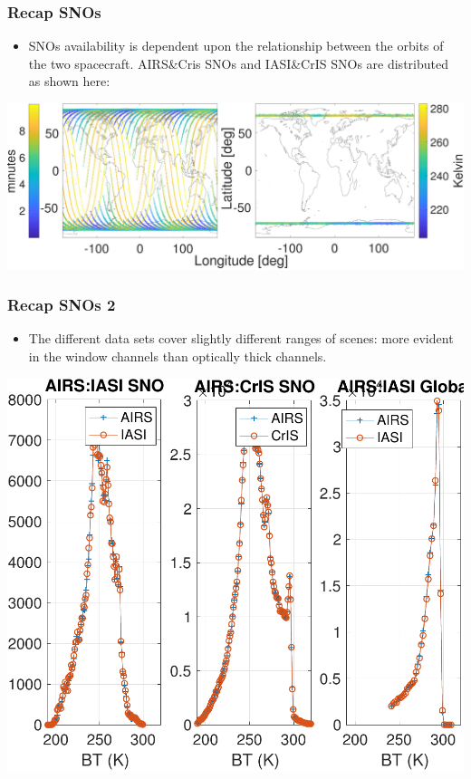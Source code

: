 \documentclass[10pt,t]{beamer}
\begin{document}
\begin{frame}
  \frametitle{Recap SNOs}
  \begin{itemize}
  \item SNOs availability is dependent upon the relationship between the orbits of the two spacecraft. AIRS\&Cris SNOs and IASI\&CrIS SNOs are distributed as shown here:
  \end{itemize}

  \begin{center}
  \includegraphics[width=\linewidth]{./Figs/Pdf/fig3_resize.pdf}
  \end{center}

\end{frame}

\begin{frame}
  \frametitle{Recap SNOs 2}
  \begin{itemize}
  \item The different data sets cover slightly different ranges of scenes: more evident in the window channels than optically thick channels.
  \end{itemize}

  \begin{center}
    \includegraphics[width=0.66\linewidth]{./Figs/Pdf/Figsfig4_new.pdf}
  \end{center}

\end{frame}
\end{document}
